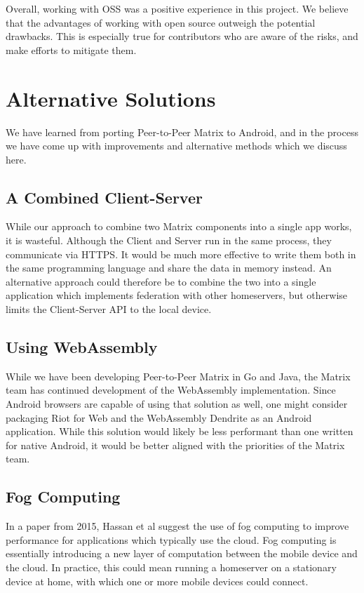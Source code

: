 Overall, working with \ac{OSS} was a positive experience in this project.
We believe that the advantages of working with open source outweigh the potential drawbacks.
This is especially true for contributors who are aware of the risks, and make efforts to mitigate them.

\section{Alternative Solutions}\label{sec:alternative_solutions}
We have learned from porting Peer-to-Peer Matrix to Android, and in the process we have come up with improvements and alternative methods which we discuss here.

\subsection{A Combined Client-Server}\label{subsec:combined_client_server}
While our approach to combine two Matrix components into a single app works, it is wasteful.
Although the Client and Server run in the same process, they communicate via HTTPS\@.
It would be much more effective to write them both in the same programming language and share the data in memory instead.
An alternative approach could therefore be to combine the two into a single application which implements federation with other homeservers, but otherwise limits the Client-Server API to the local device.

\subsection{Using WebAssembly}\label{subsec:using_webassembly}
While we have been developing Peer-to-Peer Matrix in Go and Java, the Matrix team has continued development of the WebAssembly implementation.
Since Android browsers are capable of using that solution as well, one might consider packaging Riot for Web and the WebAssembly Dendrite as an Android application.
While this solution would likely be less performant than one written for native Android, it would be better aligned with the priorities of the Matrix team.

\subsection{Fog Computing}\label{sec:fog_computing}
In a paper from 2015, Hassan et al suggest the use of fog computing to improve performance for applications which typically use the cloud\cite{hassan2015help}.
Fog computing is essentially introducing a new layer of computation between the mobile device and the cloud.
In practice, this could mean running a homeserver on a stationary device at home, with which one or more mobile devices could connect.

